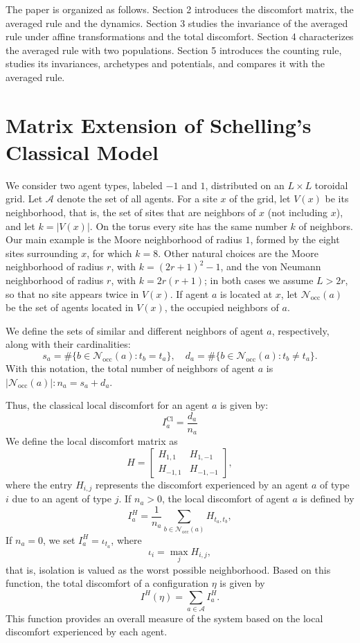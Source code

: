 \documentclass{article}
\theoremstyle{remark}
\begin{document}
The paper is organized as follows. Section 2 introduces the discomfort matrix, the averaged rule and the dynamics. Section 3 studies the invariance of the averaged rule under affine transformations and the total discomfort. Section 4 characterizes the averaged rule with two populations. Section 5 introduces the counting rule, studies its invariances, archetypes and potentials, and compares it with the averaged rule.

\section{Matrix Extension of Schelling's Classical Model}
We consider two agent types, labeled $-1$ and $1$, distributed on an $L\times L$ toroidal grid. Let $\mathcal{A}$ denote the set of all agents. For a site $x$ of the grid, let $V(x)$ be its neighborhood, that is, the set of sites that are neighbors of $x$ (not including $x$), and let $k=|V(x)|$. On the torus every site has the same number $k$ of neighbors. Our main example is the Moore neighborhood of radius $1$, formed by the eight sites surrounding $x$, for which $k=8$. Other natural choices are the Moore neighborhood of radius $r$, with $k=(2r+1)^2-1$, and the von Neumann neighborhood of radius $r$, with $k=2r(r+1)$; in both cases we assume $L>2r$, so that no site appears twice in $V(x)$. If agent $a$ is located at $x$, let $\mathcal{N}_{\mathrm{occ}}(a)$ be the set of agents located in $V(x)$, the occupied neighbors of $a$.

We define the sets of similar and different neighbors of agent $a$, respectively, along with their cardinalities:
\[
s_a=\#\{b\in \mathcal{N}_{\mathrm{occ}}(a): t_b=t_a\}, \quad d_a=\#\{b\in \mathcal{N}_{\mathrm{occ}}(a) : t_b \neq t_a \}. 
\] 
With this notation, the total number of neighbors of agent $a$ is $|\mathcal{N}_{\mathrm{occ}}(a)| :n_a=s_a+d_a.$

Thus, the classical local discomfort for an agent $a$ is given by: 
\[
I_a^{\mathrm{Cl}}=\frac{d_a}{n_a}
\]
We define the local discomfort matrix as
\[
H=\begin{bmatrix}
H_{1,1} & H_{1,-1} \\
H_{-1,1} & H_{-1,-1}
\end{bmatrix},
\]
where the entry $H_{i,j}$ represents the discomfort experienced by an agent $a$ of type $i$ due to an agent of type $j$. 
If $n_a>0$, the local discomfort of agent $a$ is defined by
\[
I_a^H = \frac{1}{n_a} \sum_{b \in \mathcal{N}_{\mathrm{occ}}(a)} H_{t_a, t_b},
\]
If $n_a=0$, we set $I_a^H=\iota_{t_a}$, where
\[
\iota_i=\max_j H_{i,j},
\]
that is, isolation is valued as the worst possible neighborhood. Based on this function, the total discomfort of a configuration $\eta$ is given by
\[
I^H(\eta) = \sum_{a \in \mathcal{A}} I_a^H.
\]
This function provides an overall measure of the system based on the local discomfort experienced by each agent.
\end{document}
